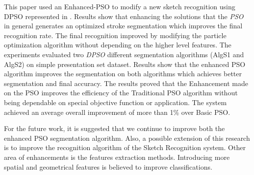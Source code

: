 \documentclass[12pt,1p,times]{elsarticle}%
\begin{document}
This paper used an Enhanced-PSO to modify a new sketch recognition using DPSO represented in \cite{mypaper}. Results show that enhancing the solutions that the \textit{PSO} in general generates an optimized stroke segmentation which improves the final recognition rate.  The final recognition improved by modifying the particle optimization algorithm without depending on the higher level features. The experiments evaluated two \textit{DPSO} different segmentation algorithms (AlgS1 and AlgS2) on simple presentation set dataset. Results show that the enhanced PSO algorithm improves the segmentation on both algorithms which achieves better segmentation and final accuracy. The results proved that the Enhancement made on the PSO improves the efficiency of the Traditional PSO algorithm without being dependable on special objective function or application. The system achieved an average overall improvement of more than 1\% over Basic PSO.  

 For the future work, it is suggested that we continue to improve both the enhanced PSO segmentation algorithm. Also, a possible extension of this research is to improve the recognition algorithm of the Sketch Recognition system. Other area of enhancements is the features extraction methods. Introducing more spatial and geometrical features is believed to improve classifications. 



\end{document}
